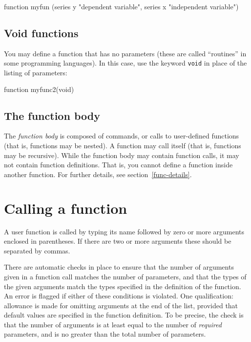 \begin{code}
function myfun (series y "dependent variable", 
                series x "independent variable")
\end{code} 

\subsection{Void functions}

You may define a function that has no parameters (these are called
``routines'' in some programming languages).  In this case,  
use the keyword \texttt{void} in place of the listing of parameters:
%    
\begin{code}
function myfunc2(void)
\end{code}


\subsection{The function body}
   
The \textsl{function body} is composed of  commands, or
calls to user-defined functions (that is, functions may be nested).  A
function may call itself (that is, functions may be recursive). While
the function body may contain function calls, it may not contain
function definitions.  That is, you cannot define a function inside
another function.  For further details, see
section~\ref{func-details}.


\section{Calling a function}
\label{func-call}

A user function is called by typing its name followed by zero or more
arguments enclosed in parentheses.  If there are two or more arguments
these should be separated by commas.  

There are automatic checks in place to ensure that the number of
arguments given in a function call matches the number of parameters,
and that the types of the given arguments match the types specified in
the definition of the function.  An error is flagged if either of
these conditions is violated.  One qualification: allowance is made
for omitting arguments at the end of the list, provided that default
values are specified in the function definition.  To be precise, the
check is that the number of arguments is at least equal to the number
of \textit{required} parameters, and is no greater than the total
number of parameters.

